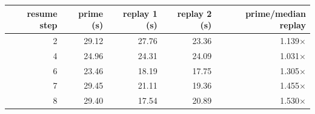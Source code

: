 \begin{tabular}{@{}rrrrr@{}}
\toprule
resume step & prime (s) & replay 1 (s) & replay 2 (s) & prime/median replay \\
\midrule
2 & 29.12 & 27.76 & 23.36 & 1.139$\times$ \\
4 & 24.96 & 24.31 & 24.09 & 1.031$\times$ \\
6 & 23.46 & 18.19 & 17.75 & 1.305$\times$ \\
7 & 29.45 & 21.11 & 19.36 & 1.455$\times$ \\
8 & 29.40 & 17.54 & 20.89 & 1.530$\times$ \\
\bottomrule
\end{tabular}
